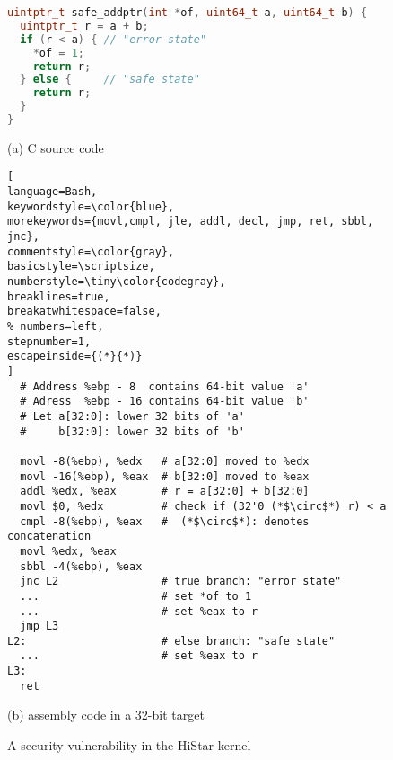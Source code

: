 \begin{figure}[t]
\begin{lstlisting}[language=C++, basicstyle=\scriptsize,keywordstyle=\color{blue},breaklines=true,
breakatwhitespace=false,morekeywords={uintptr_t,uint64_t},commentstyle=\color{gray},]
uintptr_t safe_addptr(int *of, uint64_t a, uint64_t b) {
  uintptr_t r = a + b;
  if (r < a) { // "error state" 
    *of = 1;
    return r;
  } else {     // "safe state" 
    return r;
  }
}
\end{lstlisting}
\vspace{-10pt}
\begin{center}
{\small (a) C source code}
\end{center}
\begin{lstlisting}[
language=Bash,
keywordstyle=\color{blue},
morekeywords={movl,cmpl, jle, addl, decl, jmp, ret, sbbl, jnc},
commentstyle=\color{gray},
basicstyle=\scriptsize,
numberstyle=\tiny\color{codegray},
breaklines=true,
breakatwhitespace=false,
% numbers=left,
stepnumber=1,
escapeinside={(*}{*)}
]
  # Address %ebp - 8  contains 64-bit value 'a'  
  # Adress  %ebp - 16 contains 64-bit value 'b'
  # Let a[32:0]: lower 32 bits of 'a' 
  #     b[32:0]: lower 32 bits of 'b'
  
  movl -8(%ebp), %edx   # a[32:0] moved to %edx
  movl -16(%ebp), %eax  # b[32:0] moved to %eax
  addl %edx, %eax       # r = a[32:0] + b[32:0]
  movl $0, %edx         # check if (32'0 (*$\circ$*) r) < a
  cmpl -8(%ebp), %eax   #  (*$\circ$*): denotes concatenation
  movl %edx, %eax
  sbbl -4(%ebp), %eax
  jnc L2                # true branch: "error state"
  ...                   # set *of to 1
  ...                   # set %eax to r
  jmp L3
L2:                     # else branch: "safe state"
  ...                   # set %eax to r
L3:
  ret
\end{lstlisting}
\vspace{-15pt}
\begin{center}
{\small (b) \ISA assembly code in a 32-bit target}
\end{center}
\caption{A security vulnerability in the HiStar kernel}
\label{fig:histar}
\end{figure}

